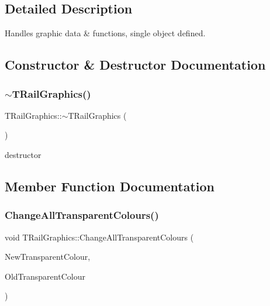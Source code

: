 \subsection{Detailed Description}
Handles graphic data \& functions, single object defined. 

\subsection{Constructor \& Destructor Documentation}
\mbox{\label{class_t_rail_graphics_ad243415e657236ecca97fa1d064cf127}} 
\subsubsection{\texorpdfstring{$\sim$\+T\+Rail\+Graphics()}{~TRailGraphics()}}
{\footnotesize\ttfamily T\+Rail\+Graphics\+::$\sim$\+T\+Rail\+Graphics (\begin{DoxyParamCaption}{ }\end{DoxyParamCaption})}

destructor 

\subsection{Member Function Documentation}
\mbox{\label{class_t_rail_graphics_a5121c6d8b8fa69eefc293ca51cddce88}} 
\subsubsection{\texorpdfstring{Change\+All\+Transparent\+Colours()}{ChangeAllTransparentColours()}}
{\footnotesize\ttfamily void T\+Rail\+Graphics\+::\+Change\+All\+Transparent\+Colours (\begin{DoxyParamCaption}\item[{T\+Color}]{New\+Transparent\+Colour,  }\item[{T\+Color}]{Old\+Transparent\+Colour }\end{DoxyParamCaption})}

